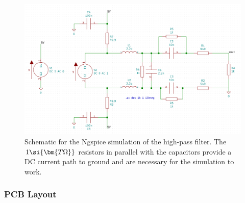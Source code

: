\begin{figure}[h]
        \centering
        \includegraphics[width=\textwidth]{data/mixer-if-amp-filter-schematic}
        \caption{Schematic for the Ngspice simulation of the high-pass filter. The
          $1 \si{\protect\bm{T\Omega}}$ resistors in parallel with the capacitors provide a DC
          current path to ground and are necessary for the simulation to work.}
        \label{fig:mixer-if-amp-filter-schematic}
\end{figure}

\subsubsection{PCB Layout}
\label{sec:ada4940-2-pcb}

